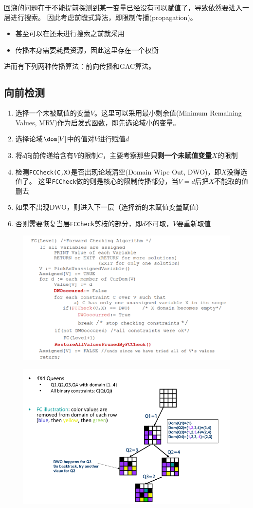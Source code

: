 回溯的问题在于不能提前探测到某一变量已经没有可以赋值了，导致依然要进入一层进行搜索。
因此考虑前瞻式算法，即限制传播(propagation)。
\begin{itemize}
	\item 甚至可以在还未进行搜索之前就采用
	\item 传播本身需要耗费资源，因此这里存在一个权衡
\end{itemize}
进而有下列两种传播算法：前向传播和GAC算法。

\subsection{向前检测}
\begin{enumerate}
	\item 选择一个未被赋值的变量$V$。这里可以采用最小剩余值(Minimum Remaining Values, MRV)作为启发式函数，即先选论域小的变量。
	\item 选择论域$\dom[V]$中的值对$V$进行赋值$d$
	\item 将$d$向前传递给含有$V$的限制$C$，主要考察那些\textbf{只剩一个未赋值变量$X$}的限制
	\item 检测\verb'FCCheck(C,X)'是否出现论域清空(Domain Wipe Out, DWO)，即$X$没得选值了。
	这里\verb'FCCheck'做的则是核心的限制传播部分，当$V=d$后把$X$不能取的值删去
	\item 如果不出现DWO，则进入下一层（选择新的未赋值变量赋值）
	\item 否则需要恢复当层\verb'FCCheck'剪枝的部分，即$d$不可取，$V$要重新取值
\end{enumerate}
\begin{figure}[H]
\centering
\includegraphics[width=0.6\linewidth]{fig/forward_checking.png}
\end{figure}
\begin{figure}[H]
\centering
\includegraphics[width=0.6\linewidth]{fig/forward_checking_eg.png}
\end{figure}

